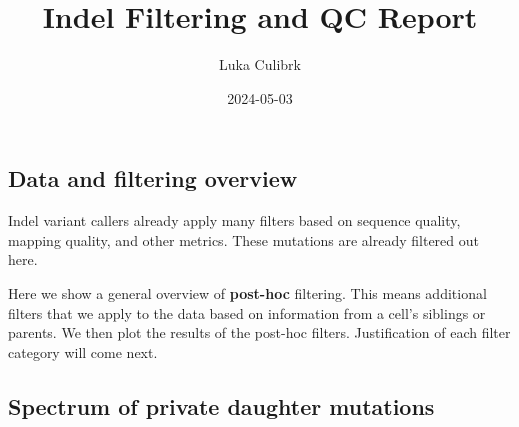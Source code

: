 \documentclass[
]{article}
\title{Indel Filtering and QC Report}
\author{Luka Culibrk}
\date{2024-05-03}
\begin{document}
\maketitle

\subsection{Data and filtering
overview}\label{data-and-filtering-overview}

Indel variant callers already apply many filters based on sequence
quality, mapping quality, and other metrics. These mutations are already
filtered out here.

Here we show a general overview of \textbf{post-hoc} filtering. This
means additional filters that we apply to the data based on information
from a cell's siblings or parents. We then plot the results of the
post-hoc filters. Justification of each filter category will come next.

\subsection{Spectrum of private daughter
mutations}\label{spectrum-of-private-daughter-mutations}
\end{document}
